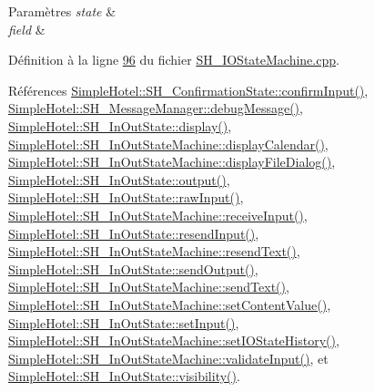 \begin{DoxyParams}{Paramètres}
{\em state} & \\
\hline
{\em field} & \\
\hline
\end{DoxyParams}


Définition à la ligne \hyperlink{SH__IOStateMachine_8cpp_source_l00096}{96} du fichier \hyperlink{SH__IOStateMachine_8cpp_source}{S\-H\-\_\-\-I\-O\-State\-Machine.\-cpp}.



Références \hyperlink{classSimpleHotel_1_1SH__ConfirmationState_a42814c25df062e1f4cf3929dd9f37a85}{Simple\-Hotel\-::\-S\-H\-\_\-\-Confirmation\-State\-::confirm\-Input()}, \hyperlink{classSimpleHotel_1_1SH__MessageManager_ad680f823897b7bf70e46ee18326c08b2}{Simple\-Hotel\-::\-S\-H\-\_\-\-Message\-Manager\-::debug\-Message()}, \hyperlink{classSimpleHotel_1_1SH__InOutState_a1cbe5befe4f42e0941165498ed0117a9}{Simple\-Hotel\-::\-S\-H\-\_\-\-In\-Out\-State\-::display()}, \hyperlink{classSimpleHotel_1_1SH__InOutStateMachine_a2801413ae1cf6e87e38e5f5366622860}{Simple\-Hotel\-::\-S\-H\-\_\-\-In\-Out\-State\-Machine\-::display\-Calendar()}, \hyperlink{classSimpleHotel_1_1SH__InOutStateMachine_a034862097f23ae05f9691ae2b45f5d2a}{Simple\-Hotel\-::\-S\-H\-\_\-\-In\-Out\-State\-Machine\-::display\-File\-Dialog()}, \hyperlink{classSimpleHotel_1_1SH__InOutState_a71b15e4d49b9c2aa540500065ceb39da}{Simple\-Hotel\-::\-S\-H\-\_\-\-In\-Out\-State\-::output()}, \hyperlink{classSimpleHotel_1_1SH__InOutState_a5e8064672e20c7b13fec67a4955a3ce3}{Simple\-Hotel\-::\-S\-H\-\_\-\-In\-Out\-State\-::raw\-Input()}, \hyperlink{classSimpleHotel_1_1SH__InOutStateMachine_a17482446bbf0327e84feb5d6a1a612f0}{Simple\-Hotel\-::\-S\-H\-\_\-\-In\-Out\-State\-Machine\-::receive\-Input()}, \hyperlink{classSimpleHotel_1_1SH__InOutState_ab259648430e9e6e0667e79398c68c0d9}{Simple\-Hotel\-::\-S\-H\-\_\-\-In\-Out\-State\-::resend\-Input()}, \hyperlink{classSimpleHotel_1_1SH__InOutStateMachine_a5db6f59d446182ab9f10e0ccb0399915}{Simple\-Hotel\-::\-S\-H\-\_\-\-In\-Out\-State\-Machine\-::resend\-Text()}, \hyperlink{classSimpleHotel_1_1SH__InOutState_a6f39ba3a9682ece4a0d2c96e8f8983a0}{Simple\-Hotel\-::\-S\-H\-\_\-\-In\-Out\-State\-::send\-Output()}, \hyperlink{classSimpleHotel_1_1SH__InOutStateMachine_ae81d4a51fcd3277ebfc11af978b74c0b}{Simple\-Hotel\-::\-S\-H\-\_\-\-In\-Out\-State\-Machine\-::send\-Text()}, \hyperlink{classSimpleHotel_1_1SH__InOutStateMachine_aaf92da452f6cf7cc57aa9e60f88322e4}{Simple\-Hotel\-::\-S\-H\-\_\-\-In\-Out\-State\-Machine\-::set\-Content\-Value()}, \hyperlink{classSimpleHotel_1_1SH__InOutState_a30d45824ca3c749427ac8d40479cf072}{Simple\-Hotel\-::\-S\-H\-\_\-\-In\-Out\-State\-::set\-Input()}, \hyperlink{classSimpleHotel_1_1SH__InOutStateMachine_a7a6675495f101d29e8eb86df84961795}{Simple\-Hotel\-::\-S\-H\-\_\-\-In\-Out\-State\-Machine\-::set\-I\-O\-State\-History()}, \hyperlink{classSimpleHotel_1_1SH__InOutStateMachine_a3754990c3f90bb7d59e5028d3d6504d8}{Simple\-Hotel\-::\-S\-H\-\_\-\-In\-Out\-State\-Machine\-::validate\-Input()}, et \hyperlink{classSimpleHotel_1_1SH__InOutState_a145a6e0e2c9e22971e35aa4538adeb4a}{Simple\-Hotel\-::\-S\-H\-\_\-\-In\-Out\-State\-::visibility()}.



